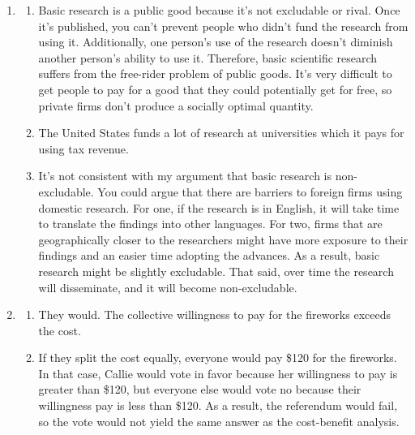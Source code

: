 \documentclass{article}
\begin{document}
\begin{enumerate}
\begin{enumerate}
	\item It's difficult to pay for public goods in a fair way, and it's difficult to decide on the optimal quantity of a public good to provide.

	\end{enumerate}
	
\item

	\begin{enumerate}
	
	\item Basic research is a public good because it's not excludable or rival. Once it's published, you can't prevent people who didn't fund the research from using it. Additionally, one person's use of the research doesn't diminish another person's ability to use it. Therefore, basic scientific research suffers from the free-rider problem of public goods. It's very difficult to get people to pay for a good that they could potentially get for free, so private firms don't produce a socially optimal quantity.
	
	\item The United States funds a lot of research at universities which it pays for using tax revenue.
	
	\item It's not consistent with my argument that basic research is non-excludable. You could argue that there are barriers to foreign firms using domestic research. For one, if the research is in English, it will take time to translate the findings into other languages. For two, firms that are geographically closer to the researchers might have more exposure to their findings and an easier time adopting the advances. As a result, basic research might be slightly excludable. That said, over time the research will disseminate, and it will become non-excludable. 
	
	\end{enumerate}
	
\item

	\begin{enumerate}
	
	\item They would. The collective willingness to pay for the fireworks exceeds the cost.
	
	\item If they split the cost equally, everyone would pay \$120 for the fireworks. In that case, Callie would vote in favor because her willingness to pay is greater than \$120, but everyone else would vote no because their willingness pay is less than \$120. As a result, the referendum would fail, so the vote would not yield the same answer as the cost-benefit analysis.
	

\end{enumerate}
\end{enumerate}
\end{document}
